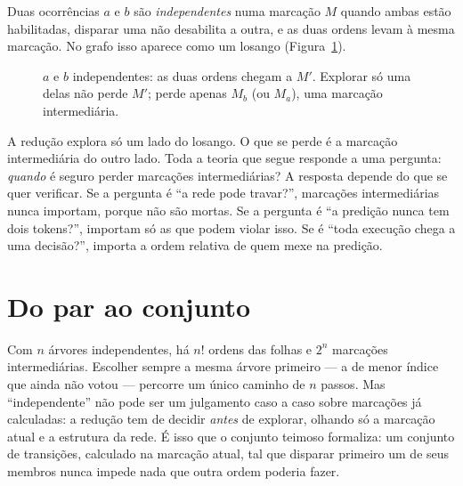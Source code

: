 \documentclass[11pt,a4paper]{report}
\theoremstyle{definition}
\begin{document}
Duas ocorrências $a$ e $b$ são \emph{independentes} numa marcação $M$ quando
ambas estão habilitadas, disparar uma não desabilita a outra, e as duas ordens
levam à mesma marcação. No grafo isso aparece como um losango
(Figura~\ref{fig:diamante}).

\begin{figure}[ht]
\centering
{}
\caption{$a$ e $b$ independentes: as duas ordens chegam a $M'$. Explorar só
uma delas não perde $M'$; perde apenas $M_b$ (ou $M_a$), uma marcação
intermediária.}
\label{fig:diamante}
\end{figure}

A redução explora só um lado do losango. O que se perde é a marcação
intermediária do outro lado. Toda a teoria que segue responde a uma pergunta:
\emph{quando} é seguro perder marcações intermediárias? A resposta depende do
que se quer verificar. Se a pergunta é ``a rede pode travar?'', marcações
intermediárias nunca importam, porque não são mortas. Se a pergunta é ``a
predição nunca tem dois tokens?'', importam só as que podem violar isso. Se é
``toda execução chega a uma decisão?'', importa a ordem relativa de quem mexe
na predição.

\section{Do par ao conjunto}

Com $n$ árvores independentes, há $n!$ ordens das folhas e $2^n$ marcações
intermediárias. Escolher sempre a mesma árvore primeiro --- a de menor índice
que ainda não votou --- percorre um único caminho de $n$ passos. Mas
``independente'' não pode ser um julgamento caso a caso sobre marcações já
calculadas: a redução tem de decidir \emph{antes} de explorar, olhando só a
marcação atual e a estrutura da rede. É isso que o conjunto teimoso
formaliza: um conjunto de transições, calculado na marcação atual, tal que
disparar primeiro um de seus membros nunca impede nada que outra ordem poderia
fazer.
\end{document}
